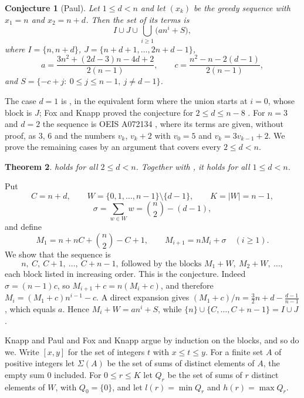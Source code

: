 \documentclass[11pt]{article}
\newtheorem{theorem}{Theorem}[section]
\newtheorem{conjecture}[theorem]{Conjecture}
\theoremstyle{remark}
\begin{document}
\begin{conjecture}[Paul]\label{conj:KP}
Let $1\le d<n$ and let $(x_k)$ be the greedy sequence with $x_1=n$ and $x_2=n+d$. Then the set of its terms is
\[
I\cup J\cup\bigcup_{i\ge 1}\bigl(an^i+S\bigr),
\]
where $I=\{n,n+d\}$, $J=\{n+d+1,\dots,2n+d-1\}$,
\[
a=\frac{3n^2+(2d-3)n-4d+2}{2(n-1)},\qquad c=\frac{n^2-n-2(d-1)}{2(n-1)},
\]
and $S=\{-c+j:\ 0\le j\le n-1,\ j\ne d-1\}$.
\end{conjecture}

The case $d=1$ is \cite[Theorem~2]{KP}, in the equivalent form where the union starts at $i=0$, whose block is $J$; Fox and Knapp proved the conjecture for $2\le d\le n-8$
\cite[Theorem~1]{FK}. For $n=3$ and $d=2$ the sequence is OEIS A072134 \cite{OEIS}, where its terms are given, without proof,
as $3$, $6$ and the numbers $v_k$, $v_k+2$ with $v_0=5$ and $v_k=3v_{k-1}+2$. We prove the remaining cases by an argument that covers every $2\le d<n$.

\begin{theorem}\label{thm:main}
 holds for all $2\le d<n$. Together with \cite[Theorem~2]{KP}, it holds for all $1\le d<n$.
\end{theorem}

Put
\[
C=n+d,\qquad W=\{0,1,\dots,n-1\}\setminus\{d-1\},\qquad K=|W|=n-1,
\]
\[
\sigma=\sum_{w\in W}w=\binom n2-(d-1),
\]
and define
\begin{equation}\label{eq:M}
M_1=n+nC+\binom n2-C+1,\qquad M_{i+1}=nM_i+\sigma\quad(i\ge 1).
\end{equation}
We show that the sequence is
\begin{equation}\label{eq:seq}
n,\ C,\ C+1,\ \dots,\ C+n-1,\ \text{followed by the blocks } M_1+W,\ M_2+W,\ \dots,
\end{equation}
each block listed in increasing order. This is the conjecture. Indeed $\sigma=(n-1)c$, so
$M_{i+1}+c=n(M_i+c)$, and therefore $M_i=(M_1+c)n^{i-1}-c$. A direct expansion gives
$(M_1+c)/n=\tfrac32 n+d-\tfrac{d-1}{n-1}$, which equals $a$. Hence $M_i+W=an^i+S$, while $\{n\}\cup\{C,\dots,C+n-1\}=I\cup J$.

Knapp and Paul \cite{KP} and Fox and Knapp \cite{FK} argue by induction on the blocks, and so do we. Write $[x,y]$
for the set of integers $t$ with $x\le t\le y$. For a finite set $A$ of positive integers let $\Sigma(A)$ be the set
of sums of distinct elements of $A$, the empty sum $0$ included. For $0\le r\le K$ let $Q_r$ be the set of sums of $r$ distinct
elements of $W$, with $Q_0=\{0\}$, and let $l(r)=\min Q_r$ and $h(r)=\max Q_r$.
\end{document}
